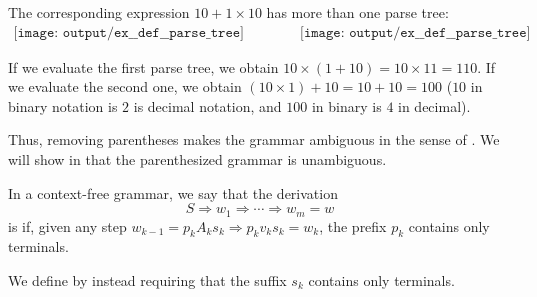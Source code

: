 \begin{example}
\begin{thmenum}
    The corresponding expression \( 10 + 1 \times 10 \) has more than one parse tree:
    \begin{equation*}
      \begin{aligned}
        \texttt{[image: output/ex\_\_def\_\_parse\_tree]}
        \qquad\qquad
        \texttt{[image: output/ex\_\_def\_\_parse\_tree]}
      \end{aligned}
    \end{equation*}

    If we evaluate the first parse tree, we obtain \( 10 \times (1 + 10) = 10 \times 11 = 110 \). If we evaluate the second one, we obtain \( (10 \times 1) + 10 = 10 + 10 = 100 \) (\( 10 \) in binary notation is \( 2 \) is decimal notation, and \( 100 \) in binary is \( 4 \) in decimal).

    Thus, removing parentheses makes the grammar ambiguous in the sense of . We will show in  that the parenthesized grammar is unambiguous.
  \end{thmenum}
\end{example}

\begin{definition}\label{def:leftmost_derivation}
  In a context-free grammar, we say that the derivation
  \begin{equation*}
    S \Rightarrow w_1 \Rightarrow \cdots \Rightarrow w_m = w
  \end{equation*}
  is  if, given any step \( w_{k-1} = p_k A_k s_k \Rightarrow p_k v_k s_k = w_k \), the prefix \( p_k \) contains only terminals.

  We define  by instead requiring that the suffix \( s_k \) contains only terminals.
\end{definition}

